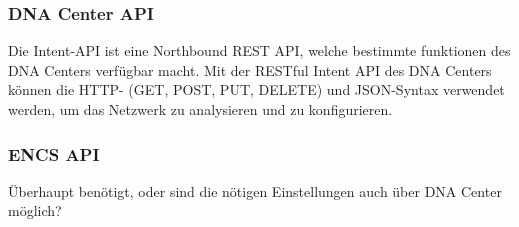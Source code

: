 \subsubsection{DNA Center API}

Die Intent-API ist eine Northbound REST API, welche bestimmte funktionen des DNA Centers verfügbar macht. Mit der RESTful Intent API des DNA Centers können die HTTP- (GET, POST, PUT, DELETE) und JSON-Syntax verwendet werden, um das Netzwerk zu analysieren und zu konfigurieren. \cite{dnac-api}

\subsubsection{ENCS API}
Überhaupt benötigt, oder sind die nötigen Einstellungen auch über DNA Center möglich?
